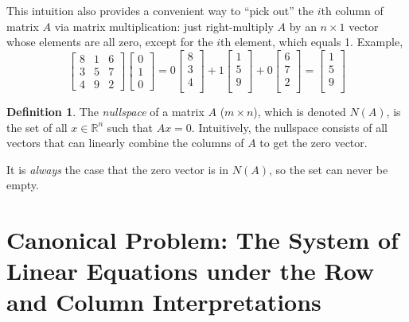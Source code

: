 \documentclass[12pt]{article}
\theoremstyle{plain}
\theoremstyle{definition}
\newtheorem{defn}[thm]{Definition}
\theoremstyle{remark}
\begin{document}
This intuition also provides a convenient way to ``pick out'' the $i$th column of matrix $A$ via matrix multiplication: just right-multiply $A$ by an $n \times 1$ vector whose elements are all zero, except for the $i$th element, which equals 1. Example,
\[
  \begin{bmatrix} 
  8 & 1 & 6 \\
  3 & 5 & 7 \\
  4 & 9 & 2 
  \end{bmatrix} 
  \begin{bmatrix} 
  0 \\ 1 \\ 0 
  \end{bmatrix} 
  = 0  
  \begin{bmatrix} 8 \\ 3 \\ 4 \\ \end{bmatrix} 
  + 1  \begin{bmatrix} 1 \\ 5 \\ 9 \\ \end{bmatrix} 
  + 0  \begin{bmatrix} 6 \\ 7 \\ 2 \\ \end{bmatrix} 
  = 
  \begin{bmatrix} 1 \\ 5 \\ 9 \\ \end{bmatrix} 
\]


\begin{defn} 
The \emph{nullspace} of a matrix $A$ ($m\times n$), which is denoted $N(A)$, is the set of all $x \in \mathbb{R}^n$ such that $Ax=0$. Intuitively, the nullspace consists of all vectors that can linearly combine the columns of $A$ to get the zero vector. 

It is \emph{always} the case that the zero vector is in $N(A)$, so the set can never be empty. 
\end{defn}


\section{Canonical Problem: The System of Linear Equations under the Row and Column Interpretations}
\end{document}
